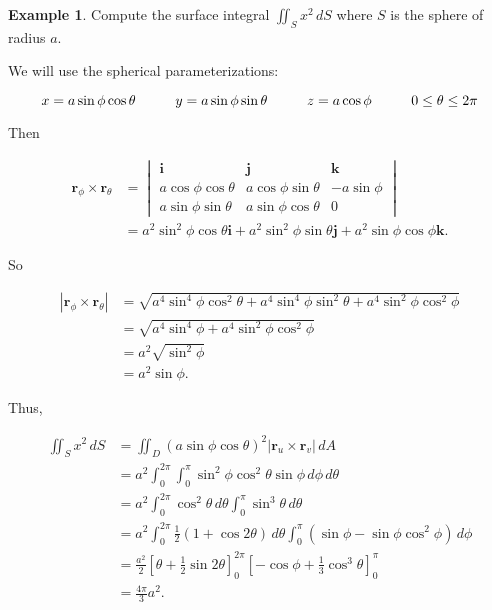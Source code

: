 \documentclass[11pt,oneside,english]{amsart}
\theoremstyle{definition}
\newtheorem*{example}{Example}
\newcommand{\pspace}{\hspace{10mm}}
\begin{document}
\begin{example}
Compute the surface integral $\iint_Sx^2\,dS$ where $S$ is the sphere of radius $a$.

We will use the spherical parameterizations:

\[
x=a\sin\phi\cos\theta\pspace y=a\sin\phi\sin\theta\pspace z=a\cos\phi\pspace0\leq \theta\leq 2\pi
\]

Then

\begin{align*}
\mathbf{r}_\phi\times\mathbf{r}_\theta&=\begin{vmatrix}\mathbf{i}&\mathbf{j}&\mathbf{k}\\ a\cos\phi\cos\theta & a\cos\phi\sin\theta & -a\sin\phi\\ a\sin\phi\sin\theta & a\sin\phi\cos\theta & 0\end{vmatrix}\\[2mm]
&=a^2\sin^2\phi\cos\theta\mathbf{i}+a^2\sin^2\phi\sin\theta\mathbf{j} +a^2\sin\phi\cos\phi\mathbf{k}.
\end{align*}

So

\begin{align*}
|\mathbf{r}_\phi\times\mathbf{r}_\theta|&=\sqrt{a^4\sin^4\phi\cos^2\theta+a^4\sin^4\phi\sin^2\theta+a^4\sin^2\phi\cos^2\phi}\\[2mm]
&=\sqrt{a^4\sin^4\phi+a^4\sin^2\phi\cos^2\phi}\\[2mm]
&=a^2\sqrt{\sin^2\phi}\\[2mm]
&=a^2\sin\phi.
\end{align*}

Thus,

\begin{align*}
\iint_Sx^2\,dS&=\iint_D(a\sin\phi\cos\theta)^2|\mathbf{r}_u\times\mathbf{r}_v|\,dA\\[2mm]
&=a^2\int_0^{2\pi}\int_0^\pi\sin^2\phi\cos^2\theta\sin\phi\,d\phi\,d\theta\\[2mm]
&=a^2\int_0^{2\pi}\cos^2\theta\,d\theta\int_0^\pi\sin^3\theta\,d\theta\\[2mm]
&=a^2\int_0^{2\pi}\frac{1}{2}(1+\cos2\theta)\,d\theta\int_0^\pi(\sin\phi-\sin\phi\cos^2\phi)\,d\phi\\[2mm]
&=\frac{a^2}{2}\left[\theta+\frac{1}{2}\sin2\theta\right]_0^{2\pi}\left[-\cos\phi+\frac{1}{3}\cos^3\theta\right]_0^\pi\\[2mm]
&=\frac{4\pi}{3}a^2.
\end{align*}
\end{example}
\end{document}
